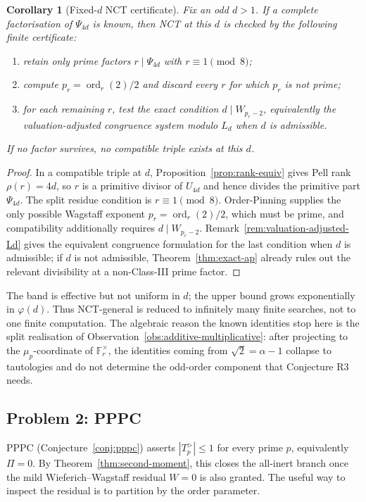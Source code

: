 \documentclass[11pt]{amsart}
\theoremstyle{plain}
\newtheorem{corollary}[theorem]{Corollary}
\theoremstyle{definition}
\theoremstyle{remark}
\numberwithin{equation}{section}
\newcommand{\ord}{\operatorname{ord}}
\newcommand{\F}{\mathbb{F}}
\begin{document}
\begin{corollary}[Fixed-$d$ NCT certificate]\label{cor:nct-fixed-d-certificate}
Fix an odd $d>1$. If a complete factorisation of $\Psi_{4d}$ is known, then NCT at this $d$ is checked by the following finite certificate:
\begin{enumerate}
\item retain only prime factors $r\mid\Psi_{4d}$ with $r\equiv1\pmod8$;
\item compute $p_r=\ord_r(2)/2$ and discard every $r$ for which $p_r$ is not prime;
\item for each remaining $r$, test the exact condition $d\mid W_{p_r-2}$, equivalently the valuation-adjusted congruence system modulo $L_d$ when $d$ is admissible.
\end{enumerate}
If no factor survives, no compatible triple exists at this $d$.
\end{corollary}

\begin{proof}
In a compatible triple at $d$, Proposition~\ref{prop:rank-equiv} gives Pell rank $\rho(r)=4d$, so $r$ is a primitive divisor of $U_{4d}$ and hence divides the primitive part $\Psi_{4d}$. The split residue condition is $r\equiv1\pmod8$. Order-Pinning supplies the only possible Wagstaff exponent $p_r=\ord_r(2)/2$, which must be prime, and compatibility additionally requires $d\mid W_{p_r-2}$. Remark~\ref{rem:valuation-adjusted-Ld} gives the equivalent congruence formulation for the last condition when $d$ is admissible; if $d$ is not admissible, Theorem~\ref{thm:exact-ap} already rules out the relevant divisibility at a non-Class-III prime factor.
\end{proof}

The band is effective but not uniform in $d$; the upper bound grows exponentially in $\varphi(d)$. Thus NCT-general is reduced to infinitely many finite searches, not to one finite computation. The algebraic reason the known identities stop here is the split realisation of Observation~\ref{obs:additive-multiplicative}: after projecting to the $\mu_p$-coordinate of $\F_r^\times$, the identities coming from $\sqrt2=\alpha-1$ collapse to tautologies and do not determine the odd-order component that Conjecture R3 needs.

\subsection{Problem 2: PPPC}\label{sec:pppc-problem}

PPPC (Conjecture~\ref{conj:pppc}) asserts $|T_p^{>}|\leq 1$ for every prime $p$, equivalently $\Pi=0$. By Theorem~\ref{thm:second-moment}, this closes the all-inert branch once the mild Wieferich--Wagstaff residual $W=0$ is also granted. The useful way to inspect the residual is to partition by the order parameter.
\end{document}
